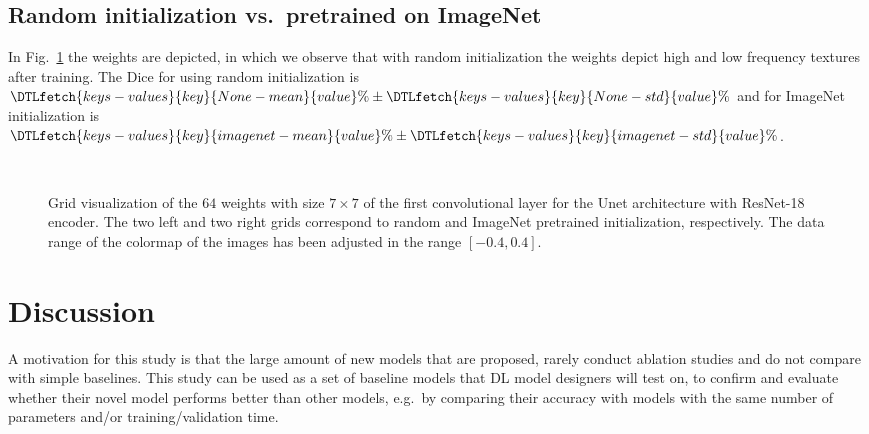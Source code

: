 \documentclass{elsarticle}
\begin{document}
\subsection{Random initialization vs.\ pretrained on ImageNet}
In Fig.~\ref{fig:weights} the weights are depicted, in which we observe that with random initialization the weights depict high and low frequency textures after training.
The Dice for using random initialization is $\DTLfetch{keys-values}{key}{None-mean}{value}\%\pm\DTLfetch{keys-values}{key}{None-std}{value}\%$ and for ImageNet initialization is $\DTLfetch{keys-values}{key}{imagenet-mean}{value}\%\pm\DTLfetch{keys-values}{key}{imagenet-std}{value}\%$.

\begin{figure}[!t]
	\centering
	\\
	\setcounter{subfigure}{0}
	\caption{Grid visualization of the $64$ weights with size $7\times 7$ of the first convolutional layer for the Unet architecture with ResNet-18 encoder.
	The two left and two right grids correspond to random and ImageNet pretrained initialization, respectively.
	The data range of the colormap of the images has been adjusted in the range $[-0.4, 0.4]$.}\label{fig:weights}
\end{figure}

\section{Discussion}\label{sec:discussion}
A motivation for this study is that the large amount of new models that are proposed, rarely conduct ablation studies and do not compare with simple baselines.
This study can be used as a set of baseline models that DL model designers will test on, to confirm and evaluate whether their novel model performs better than other models, e.g.\ by comparing their accuracy with models with the same number of parameters and/or training/validation time.
\end{document}
